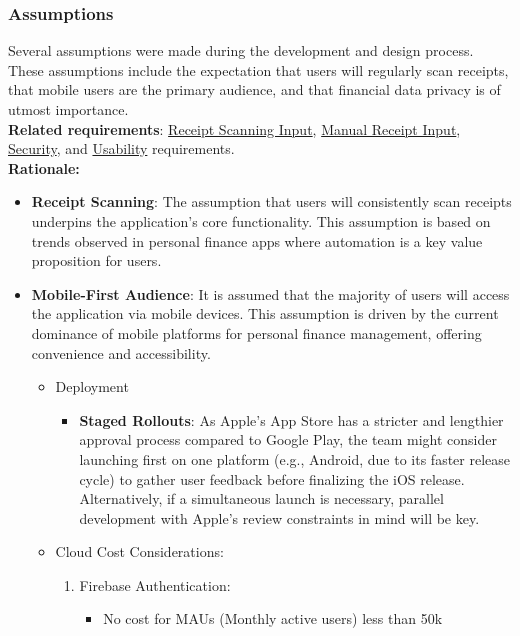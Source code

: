 \documentclass[12pt]{article}
\begin{document}
\subsubsection{Assumptions}
Several assumptions were made during the development and design process. These
assumptions include the expectation that users will regularly scan receipts,
that mobile users are the primary audience, and that financial data privacy is
of utmost importance.\\

\noindent\textbf{Related requirements}: \hyperref[FR-IP]{Receipt Scanning
Input}, \hyperref[FR-MIS]{Manual Receipt Input}, \hyperref[NFR-SEC]{Security},
and \hyperref[NFR-USAB]{Usability} requirements.\\

\noindent\textbf{Rationale:}
\begin{itemize}
    \item \textbf{Receipt Scanning}: The assumption that users will consistently
    scan receipts underpins the application's core functionality. This assumption is
    based on trends observed in personal finance apps where automation is a key
    value proposition for users.
    \item \textbf{Mobile-First Audience}: It is assumed that the majority of
    users will access the application via mobile devices. This assumption is
    driven by the current dominance of mobile platforms for personal finance
    management, offering convenience and accessibility.
		\begin{itemize}
			\item Deployment
			\begin{itemize}
				\item \textbf{Staged Rollouts}: As Apple's App Store has a stricter and lengthier approval process compared to Google Play, the team might consider launching first on one platform (e.g., Android, due to its faster release cycle) to gather user feedback
				before finalizing the iOS release. Alternatively, if a simultaneous launch is necessary, parallel development with Apple's review constraints in mind will be key.
			\end{itemize}
			\item Cloud Cost Considerations:
			\begin{enumerate}
				\item Firebase Authentication:
				\begin{itemize}
					\item No cost for MAUs (Monthly active users) less than 50k

\end{itemize}
\end{enumerate}
\end{itemize}
\end{itemize}
\end{document}
